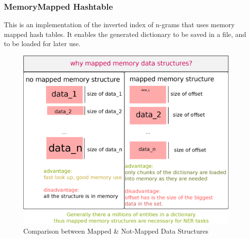 \subsubsection{MemoryMapped Hashtable}
This is an implementation of the inverted index of n-grams that uses memory mapped hash tables. It enables the generated dictionary to be saved in a file, and to be loaded for later use.

\begin{figure}[h!]
  
  \centering
    \includegraphics[scale=0.5]{graphics/memoryMappedVsNonMemoryMapped}
   \caption{Comparison between Mapped \& Not-Mapped Data Structures}
   \label{fig:mappedDataStructures}  
\end{figure}


  
